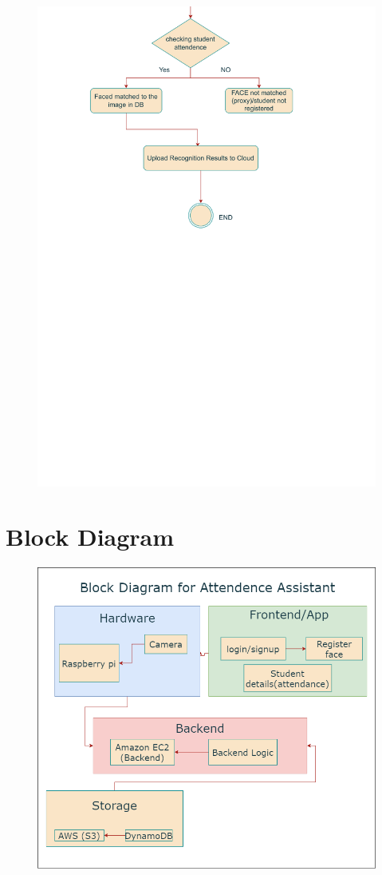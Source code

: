 \documentclass[11pt]{article}
\begin{document}
\begin{figure}[H]
    \centering
    \includegraphics[width=.90\textwidth]{activity_AA.drawio-3.png}
\end{figure}

\section{Block Diagram}
\begin{figure}[H]
    \centering
    \includegraphics[width=.95\textwidth]{block diagram.png}
\end{figure}
\end{document}

